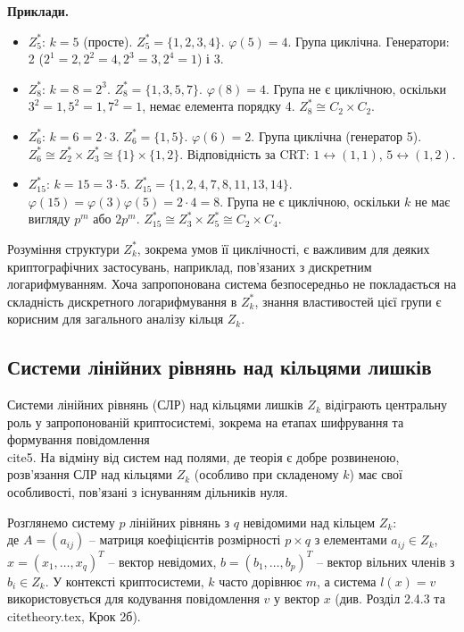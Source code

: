 \documentclass[a4paper,12pt]{article}
\begin{document}
    \textbf{Приклади.}
    \begin{itemize}
        \item \(Z_5^*\): \(k=5\) (просте). \(Z_5^* = \{1, 2, 3, 4\}\). \(\varphi(5)=4\). Група циклічна. Генератори: 2 (\(2^1=2, 2^2=4, 2^3=3, 2^4=1\)) і 3.
        \item \(Z_8^*\): \(k=8=2^3\). \(Z_8^* = \{1, 3, 5, 7\}\). \(\varphi(8)=4\). Група не є циклічною, оскільки \(3^2=1, 5^2=1, 7^2=1\), немає елемента порядку 4. \(Z_8^* \cong C_2 \times C_2\).
        \item \(Z_6^*\): \(k=6=2 \cdot 3\). \(Z_6^* = \{1, 5\}\). \(\varphi(6)=2\). Група циклічна (генератор 5). \(Z_6^* \cong Z_2^* \times Z_3^* \cong \{1\} \times \{1, 2\}\). Відповідність за CRT: \(1 \leftrightarrow (1,1)\), \(5 \leftrightarrow (1,2)\).
        \item \(Z_{15}^*\): \(k=15=3 \cdot 5\). \(Z_{15}^* = \{1, 2, 4, 7, 8, 11, 13, 14\}\). \(\varphi(15) = \varphi(3)\varphi(5) = 2 \cdot 4 = 8\). Група не є циклічною, оскільки \(k\) не має вигляду \(p^m\) або \(2p^m\). \(Z_{15}^* \cong Z_3^* \times Z_5^* \cong C_2 \times C_4\).
    \end{itemize}
    Розуміння структури \(Z_k^*\), зокрема умов її циклічності, є важливим для деяких криптографічних застосувань, наприклад, пов'язаних з дискретним логарифмуванням. Хоча запропонована система безпосередньо не покладається на складність дискретного логарифмування в \(Z_k^*\), знання властивостей цієї групи є корисним для загального аналізу кільця \(Z_k\).

    \subsection{Системи лінійних рівнянь над кільцями лишків} %
    Системи лінійних рівнянь (СЛР) над кільцями лишків \(Z_k\) відіграють центральну роль у запропонованій криптосистемі, зокрема на етапах шифрування та формування повідомлення \\cite{5}. На відміну від систем над полями, де теорія є добре розвиненою, розв'язання СЛР над кільцями \(Z_k\) (особливо при складеному \(k\)) має свої особливості, пов'язані з існуванням дільників нуля.

    Розглянемо систему \(p\) лінійних рівнянь з \(q\) невідомими над кільцем \(Z_k\):
    \\[ Ax \equiv b \pmod k \\]
    де \(A = (a_{ij})\) -- матриця коефіцієнтів розмірності \(p \times q\) з елементами \(a_{ij} \in Z_k\), \(x = (x_1, \ldots, x_q)^T\) -- вектор невідомих, \(b = (b_1, \ldots, b_p)^T\) -- вектор вільних членів з \(b_i \in Z_k\). У контексті криптосистеми, \(k\) часто дорівнює \(m\), а система \(l(x)=v\) використовується для кодування повідомлення \(v\) у вектор \(x\) (див. Розділ 2.4.3 та \\cite{theory.tex}, Крок 2б).
\end{document}
